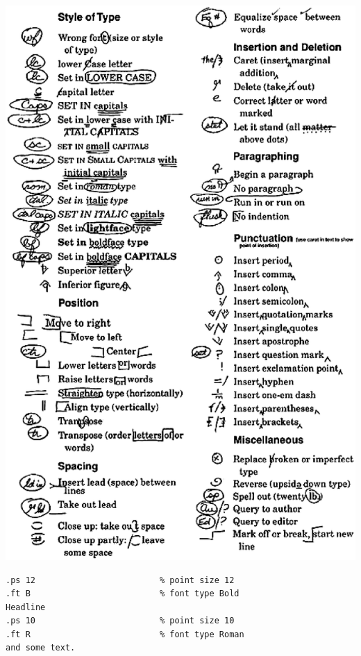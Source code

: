 \documentclass[a4paper,landscape,headrule,footrule,xetex]{foils}
\begin{document}
\includegraphics[trim= 0mm 188mm 0mm 0mm, clip=true, width=\textwidth]{../pics/proofreaders-marks.eps}





\begin{verbatim}
.ps 12                         % point size 12
.ft B                          % font type Bold
Headline
.ps 10                         % point size 10
.ft R                          % font type Roman
and some text.
\end{verbatim} 
\end{document}
